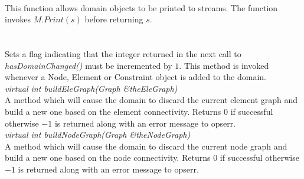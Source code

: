 \\  
This function allows domain objects to be printed to streams. The
function invokes $M.Print(s)$ before returning $s$. \\

  \\
\\
Sets a flag indicating that the integer returned in the next call to 
{\em hasDomainChanged()} must be incremented by $1$. This method is
invoked whenever a Node, Element or Constraint object is added to the
domain. \\ 

{\em virtual int buildEleGraph(Graph \&theEleGraph)} \\
A method which will cause the domain to discard the current element
graph and build a new one based on the element connectivity. Returns
$0$ if successful otherwise $-1$ is returned along with an error
message to opserr. \\

{\em virtual int buildNodeGraph(Graph \&theNodeGraph)} \\
A method which will cause the domain to discard the current node
graph and build a new one based on the node connectivity. Returns
$0$ if successful otherwise $-1$ is returned along with an error
message to opserr. \\





